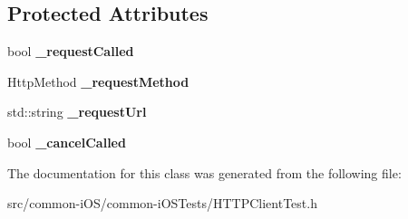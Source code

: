 \subsection*{Protected Attributes}
\begin{DoxyCompactItemize}
\item 
\hypertarget{class_h_t_t_p_client_test_adb112f868ca207cf89cf61bf427b9908}{}\label{class_h_t_t_p_client_test_adb112f868ca207cf89cf61bf427b9908} 
bool {\bfseries \+\_\+request\+Called}
\item 
\hypertarget{class_h_t_t_p_client_test_ad232b573e1b48904035b6971e7750e9c}{}\label{class_h_t_t_p_client_test_ad232b573e1b48904035b6971e7750e9c} 
Http\+Method {\bfseries \+\_\+request\+Method}
\item 
\hypertarget{class_h_t_t_p_client_test_a299de0643ae2f75068ba4ad2228e3dfb}{}\label{class_h_t_t_p_client_test_a299de0643ae2f75068ba4ad2228e3dfb} 
std\+::string {\bfseries \+\_\+request\+Url}
\item 
\hypertarget{class_h_t_t_p_client_test_a554cc9bcf36c9ec5fa4ecc6821598840}{}\label{class_h_t_t_p_client_test_a554cc9bcf36c9ec5fa4ecc6821598840} 
bool {\bfseries \+\_\+cancel\+Called}
\end{DoxyCompactItemize}


The documentation for this class was generated from the following file\+:\begin{DoxyCompactItemize}
\item 
src/common-\/i\+O\+S/common-\/i\+O\+S\+Tests/H\+T\+T\+P\+Client\+Test.\+h\end{DoxyCompactItemize}
